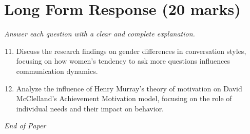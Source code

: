 \documentclass[12pt]{article}
\begin{document}
\section*{Long Form Response (20 marks)}
\textit{Answer each question with a clear and complete explanation.}
\begin{enumerate}[label=\arabic*.]
\setcounter{enumi}{10}
\item Discuss the research findings on gender differences in conversation styles, focusing on how women's tendency to ask more questions influences communication dynamics.
\item Analyze the influence of Henry Murray's theory of motivation on David McClelland's Achievement Motivation model, focusing on the role of individual needs and their impact on behavior.
\end{enumerate}

\vfill
\noindent\textit{End of Paper}
\end{document}
